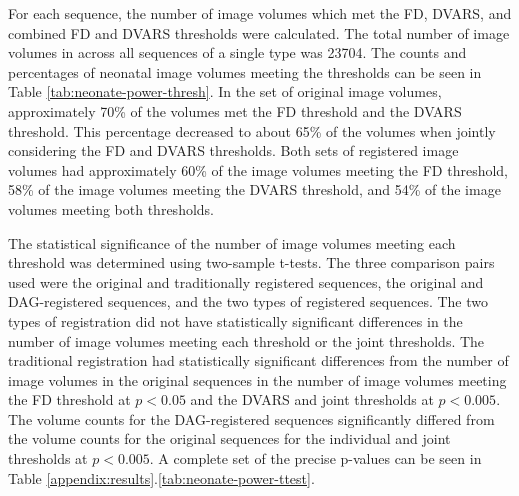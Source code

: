 For each sequence, the number of image volumes which met the FD, DVARS, and combined FD and DVARS thresholds were calculated. The total number of image volumes in across all sequences of a single type was 23704. The counts and percentages of neonatal image volumes meeting the thresholds can be seen in Table \ref{tab:neonate-power-thresh}. In the set of original image volumes, approximately 70\% of the volumes met the FD threshold and the DVARS threshold. This percentage decreased to about 65\% of the volumes when jointly considering the FD and DVARS thresholds. Both sets of registered image volumes had approximately 60\% of the image volumes meeting the FD threshold, 58\% of the image volumes meeting the DVARS threshold, and 54\% of the image volumes meeting both thresholds.

The statistical significance of the number of image volumes meeting each threshold was determined using two-sample t-tests. The three comparison pairs used were the original and traditionally registered sequences, the original and DAG-registered sequences, and the two types of registered sequences. The two types of registration did not have statistically significant differences in the number of image volumes meeting each threshold or the joint thresholds. The traditional registration had statistically significant differences from the number of image volumes in the original sequences in the number of image volumes meeting the FD threshold at $p < 0.05$ and the DVARS and joint thresholds at $p < 0.005$. The volume counts for the DAG-registered sequences significantly differed from the volume counts for the original sequences for the individual and joint thresholds at $p < 0.005$. A complete set of the precise p-values can be seen in Table \ref{appendix:results}.\ref{tab:neonate-power-ttest}.

